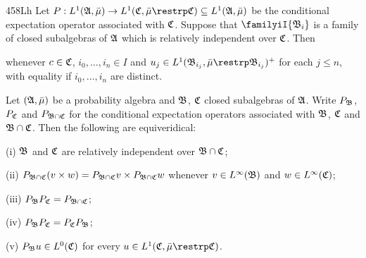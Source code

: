 \spheader 458Lh  Let
$P:L^1(\frak A,\bar\mu)\to L^1(\frak C,\bar\mu\restrp\frak C)
\subseteq L^1(\frak A,\bar\mu)$
be the conditional expectation operator associated with
$\frak C$.   Suppose that
$\familyiI{\frak B_i}$ is a family of closed subalgebras of $\frak A$ which
is relatively independent over $\frak C$.   Then


\noindent whenever $c\in\frak C$, $i_0,\ldots,i_n\in I$ and
$u_j\in L^1(\frak B_{i_j},\bar\mu\restrp\frak B_{i_j})^+$ for each
$j\le n$, with equality if $i_0,\ldots,i_n$ are distinct.

Let $(\frak A,\bar\mu)$ be a probability algebra and
$\frak B$, $\frak C$ closed subalgebras of $\frak A$.   Write
$P_{\frak B}$, $P_{\frak C}$ and $P_{\frak B\cap\frak C}$
for the conditional expectation operators associated with
$\frak B$, $\frak C$ and $\frak B\cap\frak C$.   Then the following are
equiveridical:

(i) $\frak B$ and $\frak C$ are relatively independent over
$\frak B\cap\frak C$;

(ii) $P_{\frak B\cap\frak C}(v\times w)
=P_{\frak B\cap\frak C}v\times P_{\frak B\cap\frak C}w$ whenever
$v\in L^{\infty}(\frak B)$ and $w\in L^{\infty}(\frak C)$;

(iii) $P_{\frak B}P_{\frak C}=P_{\frak B\cap\frak C}$;

(iv) $P_{\frak B}P_{\frak C}=P_{\frak C}P_{\frak B}$;

(v) $P_{\frak B}u\in L^0(\frak C)$
for every $u\in L^1(\frak C,\bar\mu\restrp\frak C)$.

